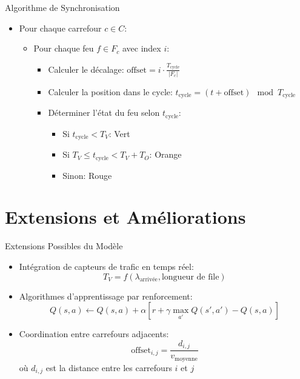 \documentclass{beamer}
\begin{document}
\begin{frame}{Algorithme de Synchronisation}
\begin{itemize}
    \item Pour chaque carrefour $c \in C$:
    \begin{itemize}
        \item Pour chaque feu $f \in F_c$ avec index $i$:
        \begin{itemize}
            \item Calculer le décalage: $\text{offset} = i \cdot \frac{T_{\text{cycle}}}{|F_c|}$
            \item Calculer la position dans le cycle: $t_{\text{cycle}} = (t + \text{offset}) \mod T_{\text{cycle}}$
            \item Déterminer l'état du feu selon $t_{\text{cycle}}$:
            \begin{itemize}
                \item Si $t_{\text{cycle}} < T_V$: Vert
                \item Si $T_V \leq t_{\text{cycle}} < T_V + T_O$: Orange
                \item Sinon: Rouge
            \end{itemize}
        \end{itemize}
    \end{itemize}
\end{itemize}
\end{frame}

\section{Extensions et Améliorations}

\begin{frame}{Extensions Possibles du Modèle}
\begin{itemize}
    \item Intégration de capteurs de trafic en temps réel:
    \begin{equation}
    T_V = f(\lambda_{\text{arrivée}}, \text{longueur de file})
    \end{equation}
    
    \item Algorithmes d'apprentissage par renforcement:
    \begin{equation}
    Q(s,a) \leftarrow Q(s,a) + \alpha [r + \gamma \max_{a'} Q(s',a') - Q(s,a)]
    \end{equation}
    
    \item Coordination entre carrefours adjacents:
    \begin{equation}
    \text{offset}_{i,j} = \frac{d_{i,j}}{v_{\text{moyenne}}}
    \end{equation}
    où $d_{i,j}$ est la distance entre les carrefours $i$ et $j$
\end{itemize}
\end{frame}
\end{document}
